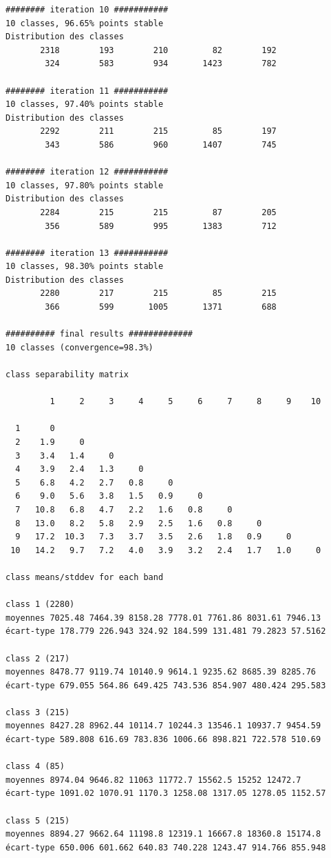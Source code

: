 \documentclass[earth,article,submit,pdftex,moreauthors]{Definitions/mdpi}
\begin{document}
{\begin{scriptsize}
\begin{verbatim}
######## iteration 10 ###########
10 classes, 96.65% points stable
Distribution des classes
       2318        193        210         82        192
        324        583        934       1423        782

######## iteration 11 ###########
10 classes, 97.40% points stable
Distribution des classes
       2292        211        215         85        197
        343        586        960       1407        745

######## iteration 12 ###########
10 classes, 97.80% points stable
Distribution des classes
       2284        215        215         87        205
        356        589        995       1383        712

######## iteration 13 ###########
10 classes, 98.30% points stable
Distribution des classes
       2280        217        215         85        215
        366        599       1005       1371        688

########## final results #############
10 classes (convergence=98.3%)

class separability matrix

         1     2     3     4     5     6     7     8     9    10

  1      0
  2    1.9     0
  3    3.4   1.4     0
  4    3.9   2.4   1.3     0
  5    6.8   4.2   2.7   0.8     0
  6    9.0   5.6   3.8   1.5   0.9     0
  7   10.8   6.8   4.7   2.2   1.6   0.8     0
  8   13.0   8.2   5.8   2.9   2.5   1.6   0.8     0
  9   17.2  10.3   7.3   3.7   3.5   2.6   1.8   0.9     0
 10   14.2   9.7   7.2   4.0   3.9   3.2   2.4   1.7   1.0     0

class means/stddev for each band

class 1 (2280)
moyennes 7025.48 7464.39 8158.28 7778.01 7761.86 8031.61 7946.13
écart-type 178.779 226.943 324.92 184.599 131.481 79.2823 57.5162

class 2 (217)
moyennes 8478.77 9119.74 10140.9 9614.1 9235.62 8685.39 8285.76
écart-type 679.055 564.86 649.425 743.536 854.907 480.424 295.583

class 3 (215)
moyennes 8427.28 8962.44 10114.7 10244.3 13546.1 10937.7 9454.59
écart-type 589.808 616.69 783.836 1006.66 898.821 722.578 510.69

class 4 (85)
moyennes 8974.04 9646.82 11063 11772.7 15562.5 15252 12472.7
écart-type 1091.02 1070.91 1170.3 1258.08 1317.05 1278.05 1152.57

class 5 (215)
moyennes 8894.27 9662.64 11198.8 12319.1 16667.8 18360.8 15174.8
écart-type 650.006 601.662 640.83 740.228 1243.47 914.766 855.948


\end{verbatim}
\end{scriptsize}}
\end{document}
